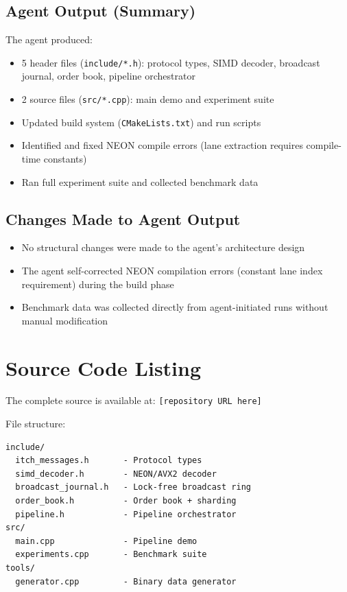 \documentclass[conference]{IEEEtran}
\begin{document}
\subsection{Agent Output (Summary)}

The agent produced:
\begin{itemize}
    \item 5 header files (\texttt{include/*.h}): protocol types, SIMD decoder, broadcast journal, order book, pipeline orchestrator
    \item 2 source files (\texttt{src/*.cpp}): main demo and experiment suite
    \item Updated build system (\texttt{CMakeLists.txt}) and run scripts
    \item Identified and fixed NEON compile errors (lane extraction requires compile-time constants)
    \item Ran full experiment suite and collected benchmark data
\end{itemize}

\subsection{Changes Made to Agent Output}

\begin{itemize}
    \item No structural changes were made to the agent's architecture design
    \item The agent self-corrected NEON compilation errors (constant lane index requirement) during the build phase
    \item Benchmark data was collected directly from agent-initiated runs without manual modification
\end{itemize}

\section{Source Code Listing}
\label{sec:appendix-code}

The complete source is available at: \texttt{[repository URL here]}

File structure:
\begin{verbatim}
include/
  itch_messages.h       - Protocol types
  simd_decoder.h        - NEON/AVX2 decoder
  broadcast_journal.h   - Lock-free broadcast ring
  order_book.h          - Order book + sharding
  pipeline.h            - Pipeline orchestrator
src/
  main.cpp              - Pipeline demo
  experiments.cpp       - Benchmark suite
tools/
  generator.cpp         - Binary data generator
\end{verbatim}
\end{document}
